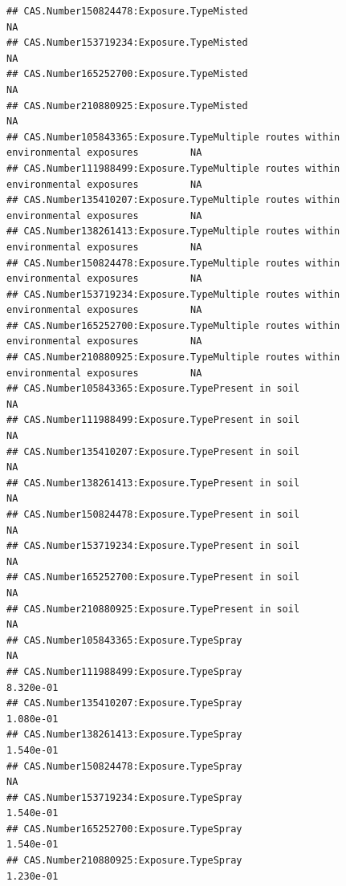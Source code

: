 \documentclass[
  12pt,
]{article}
\begin{document}
\begin{verbatim}
## CAS.Number150824478:Exposure.TypeMisted                                                 NA
## CAS.Number153719234:Exposure.TypeMisted                                                 NA
## CAS.Number165252700:Exposure.TypeMisted                                                 NA
## CAS.Number210880925:Exposure.TypeMisted                                                 NA
## CAS.Number105843365:Exposure.TypeMultiple routes within environmental exposures         NA
## CAS.Number111988499:Exposure.TypeMultiple routes within environmental exposures         NA
## CAS.Number135410207:Exposure.TypeMultiple routes within environmental exposures         NA
## CAS.Number138261413:Exposure.TypeMultiple routes within environmental exposures         NA
## CAS.Number150824478:Exposure.TypeMultiple routes within environmental exposures         NA
## CAS.Number153719234:Exposure.TypeMultiple routes within environmental exposures         NA
## CAS.Number165252700:Exposure.TypeMultiple routes within environmental exposures         NA
## CAS.Number210880925:Exposure.TypeMultiple routes within environmental exposures         NA
## CAS.Number105843365:Exposure.TypePresent in soil                                        NA
## CAS.Number111988499:Exposure.TypePresent in soil                                        NA
## CAS.Number135410207:Exposure.TypePresent in soil                                        NA
## CAS.Number138261413:Exposure.TypePresent in soil                                        NA
## CAS.Number150824478:Exposure.TypePresent in soil                                        NA
## CAS.Number153719234:Exposure.TypePresent in soil                                        NA
## CAS.Number165252700:Exposure.TypePresent in soil                                        NA
## CAS.Number210880925:Exposure.TypePresent in soil                                        NA
## CAS.Number105843365:Exposure.TypeSpray                                                  NA
## CAS.Number111988499:Exposure.TypeSpray                                           8.320e-01
## CAS.Number135410207:Exposure.TypeSpray                                           1.080e-01
## CAS.Number138261413:Exposure.TypeSpray                                           1.540e-01
## CAS.Number150824478:Exposure.TypeSpray                                                  NA
## CAS.Number153719234:Exposure.TypeSpray                                           1.540e-01
## CAS.Number165252700:Exposure.TypeSpray                                           1.540e-01
## CAS.Number210880925:Exposure.TypeSpray                                           1.230e-01

\end{verbatim}
\end{document}
